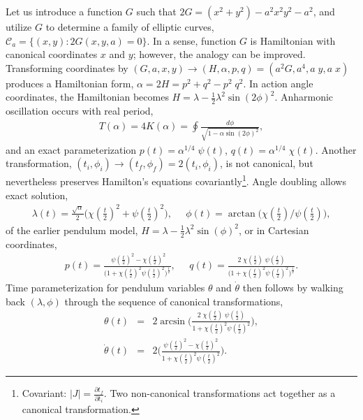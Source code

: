 \documentclass[nofootinbib,preprint]{revtex4-1}
\begin{document}
Let us introduce a function $G$ such that $2G=(x^2+y^2)-a^2 x^2 y^2-a^2$,
and utilize $G$ to determine a family of elliptic curves, 
$\mathcal{C}_a=\{(x,y):2G(x,y,a)=0\}$. In a sense, function $G$ is Hamiltonian 
with canonical coordinates $x$ and $y$; however, the analogy can be improved. 
Transforming coordinates by  $(G,a,x,y) \rightarrow (H,\alpha,p,q)=(a^2 G,a^4,a\;y,a\;x)$ 
produces a Hamiltonian form, $\alpha=2H=p^2+q^2 - p^2 \; q^2$. In action angle 
coordinates, the Hamiltonian becomes $H = \lambda-\frac{1}{2}\lambda^2\sin(2\phi)^2$. 
Anharmonic oscillation occurs with real period, 
\begin{eqnarray}
T(\alpha) = 4K(\alpha) = \oint \frac{d\phi}{\sqrt{1-\alpha\sin(2\phi)^2}},\nonumber
\end{eqnarray}
and an exact parameterization $p(t)=\alpha^{1/4} \;\psi(t)$, $q(t)=\alpha^{1/4} \;\chi(t)$. 
Another transformation, $(t_i,\phi_i)\rightarrow (t_f,\phi_f)=2(t_i,\phi_i)$, is not
canonical, but nevertheless preserves Hamilton's equations  covariantly\footnote{Covariant: 
$|J|=\frac{\partial t_f}{\partial t_i}$. Two non-canonical transformations act together as 
a canonical transformation.}. Angle doubling allows exact solution, 
\begin{eqnarray}
\lambda(t) = \frac{\sqrt{\alpha}}{2}\Big(\chi(\tfrac{t}{2})^2 + \psi(\tfrac{t}{2})^2\Big), \;\;\;\;\; 
\phi(t)   =  \arctan\big(\chi(\tfrac{t}{2})/\psi(\tfrac{t}{2})\big),  \nonumber 
\end{eqnarray}
of the earlier pendulum model, $H = \lambda-\frac{1}{2}\lambda^2\sin(\phi)^2$, or in Cartesian 
coordinates, 
\begin{eqnarray}
p(t)   =  \frac{ \; \psi(\tfrac{t}{2})^2-\chi(\tfrac{t}{2})^2 
}{\Big(1+\chi(\tfrac{t}{2})^2  \psi(\tfrac{t}{2})^2\Big)^{\frac{1}{2}}},  \;\;\;\;\; 
q(t)  = \frac{2 \;  \chi(\tfrac{t}{2})\;\psi(\tfrac{t}{2}) 
}{\Big(1+\chi(\tfrac{t}{2})^2 \psi(\tfrac{t}{2})^2\Big)^{\frac{1}{2}}}. \nonumber 
\end{eqnarray}
Time parameterization for pendulum variables $\theta$ and $\dot{\theta}$ then follows by 
walking back $(\lambda,\phi)$ through the sequence of canonical transformations,
\begin{eqnarray}
\theta(t) &=& 2 \arcsin\bigg(\frac{2\;\chi(\tfrac{t}{2})\; \psi(\tfrac{t}{2})
}{1+\chi(\tfrac{t}{2})^2 \psi(\tfrac{t}{2})^2 }\bigg), \nonumber \\
\dot{\theta}(t) &=& 2\bigg(\frac{\psi(\tfrac{t}{2})^2 - \chi(\tfrac{t}{2})^2
}{1+\chi(\tfrac{t}{2})^2 \psi(\tfrac{t}{2})^2 }\bigg). \nonumber 
\end{eqnarray}
\end{document}
